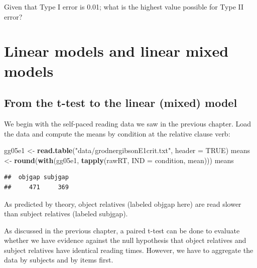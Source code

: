 \documentclass[12pt,]{krantz}
\newenvironment{Shaded}{\begin{snugshade}}{\end{snugshade}}
\newcommand{\DataTypeTok}[1]{\textcolor[rgb]{0.13,0.29,0.53}{#1}}
\newcommand{\KeywordTok}[1]{\textcolor[rgb]{0.13,0.29,0.53}{\textbf{#1}}}
\newcommand{\NormalTok}[1]{#1}
\newcommand{\OperatorTok}[1]{\textcolor[rgb]{0.81,0.36,0.00}{\textbf{#1}}}
\newcommand{\OtherTok}[1]{\textcolor[rgb]{0.56,0.35,0.01}{#1}}
\newcommand{\StringTok}[1]{\textcolor[rgb]{0.31,0.60,0.02}{#1}}
\begin{document}
Given that Type I error is 0.01; what is the highest value possible for Type II error?

\hypertarget{linear-models-and-linear-mixed-models}{%
\chapter{Linear models and linear mixed models}\label{linear-models-and-linear-mixed-models}}

\hypertarget{from-the-t-test-to-the-linear-mixed-model}{%
\section{From the t-test to the linear (mixed) model}\label{from-the-t-test-to-the-linear-mixed-model}}

We begin with the \citet{grodner} self-paced reading data we saw in the previous chapter. Load the data and compute the means by condition at the relative clause verb:

\begin{Shaded}
\begin{Highlighting}[]
\NormalTok{gg05e1 <-}\StringTok{ }\KeywordTok{read.table}\NormalTok{(}\StringTok{"data/grodnergibsonE1crit.txt"}\NormalTok{, }
  \DataTypeTok{header =} \OtherTok{TRUE}\NormalTok{)}
\NormalTok{means <-}\StringTok{ }\KeywordTok{round}\NormalTok{(}\KeywordTok{with}\NormalTok{(gg05e1, }\KeywordTok{tapply}\NormalTok{(rawRT, }\DataTypeTok{IND =}\NormalTok{ condition, }
\NormalTok{  mean)))}
\NormalTok{means}
\end{Highlighting}
\end{Shaded}

\begin{verbatim}
##  objgap subjgap 
##     471     369
\end{verbatim}

As predicted by theory, object relatives (labeled objgap here) are read slower than subject relatives (labeled subjgap).

As discussed in the previous chapter, a paired t-test can be done to evaluate whether we have evidence against the null hypothesis that object relatives and subject relatives have identical reading times. However, we have to aggregate the data by subjects and by items first.

\begin{Shaded}
\end{Shaded}
\end{document}
